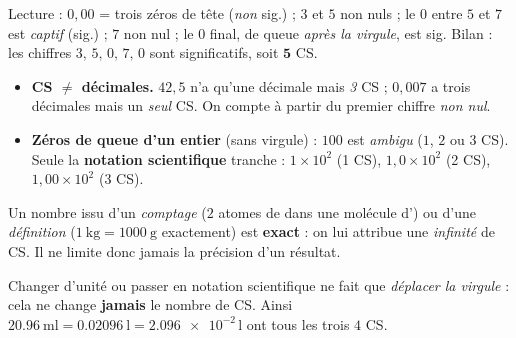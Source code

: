 \documentclass[11pt,a4paper]{article}
\begin{document}
\begin{exemplebox}[le cas qui contient tout : $m=0,0035070$]
\begin{center}
\end{center}
Lecture : $0,00$ = trois zéros de tête (\emph{non} sig.) ; $3$ et $5$ non nuls ; le $0$ entre $5$ et $7$
est \emph{captif} (sig.) ; $7$ non nul ; le $0$ final, de queue \emph{après la virgule}, est sig.
Bilan : les chiffres $3,\,5,\,0,\,7,\,0$ sont significatifs, soit $\mathbf{5}$ CS.
\end{exemplebox}

\begin{piege}
\begin{itemize}[leftmargin=1.6em,topsep=2pt,itemsep=2pt]
  \item \textbf{CS $\neq$ décimales.} $42,5$ n'a qu'une décimale mais \emph{3} CS ; $0,007$ a trois
        décimales mais un \emph{seul} CS. On compte à partir du premier chiffre \emph{non nul}.
  \item \textbf{Zéros de queue d'un entier} (sans virgule) : $100$ est \emph{ambigu} ($1$, $2$ ou $3$
        CS). Seule la \textbf{notation scientifique} tranche : $1\times10^{2}$ (1 CS),
        $1,0\times10^{2}$ (2 CS), $1,00\times10^{2}$ (3 CS).
\end{itemize}
\end{piege}

\begin{cle}
Un nombre issu d'un \emph{comptage} ($2$ atomes de  dans une molécule d') ou d'une
\emph{définition} ($\qty{1}{\kilo\gram}=\qty{1000}{\gram}$ exactement) est \textbf{exact} : on lui
attribue une \emph{infinité} de CS. Il ne limite donc jamais la précision d'un résultat.
\end{cle}

\begin{remarque}
Changer d'unité ou passer en notation scientifique ne fait que \emph{déplacer la virgule} : cela ne
change \textbf{jamais} le nombre de CS. Ainsi $\qty{20,96}{\milli\litre}=\qty{0,02096}{\litre}
=\num{2,096e-2}\,\si{\litre}$ ont tous les trois $4$ CS.
\end{remarque}
\end{document}
